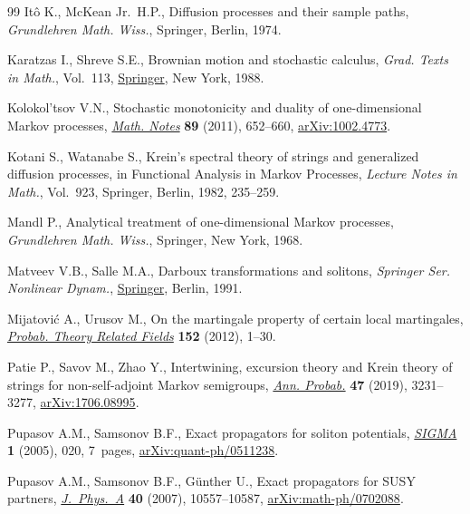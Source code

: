 \documentclass[10pt,a4paper]{amsart}
\numberwithin{equation}{section}
\theoremstyle{definition}
\def\i{{\textnormal i}}
\begin{document}
\begin{thebibliography}{99}
It\^o K., McKean Jr.~H.P., Diffusion processes and their sample paths,
 \textit{Grundlehren Math. Wiss.}, Springer, Berlin, 1974.

Karatzas I., Shreve S.E., Brownian motion and stochastic calculus,
 \textit{Grad. Texts in Math.}, Vol.~113,
 \href{https://doi.org/10.1007/978-1-4684-0302-2}{Springer}, New York, 1988.

Kolokol'tsov V.N., Stochastic monotonicity and duality of one-dimensional
 {M}arkov processes,
 \href{https://doi.org/10.1134/S0001434611050063}{\textit{Math. Notes}}
 \textbf{89} (2011), 652--660,
 \href{http://arxiv.org/abs/1002.4773}{arXiv:1002.4773}.

Kotani S., Watanabe S., Kre\u{\i}n's spectral theory of strings and generalized
 diffusion processes, in Functional {A}nalysis in {M}arkov {P}rocesses,
 \textit{Lecture Notes in Math.}, Vol.~923, Springer, Berlin, 1982, 235--259.

Mandl P., Analytical treatment of one-dimensional {M}arkov processes,
 \textit{Grundlehren Math. Wiss.}, Springer, New York, 1968.

Matveev V.B., Salle M.A., Darboux transformations and solitons, \textit{Springer Ser. Nonlinear Dynam.}, \href{https://doi.org/10.1007/978-3-662-00922-2}{Springer},
 Berlin, 1991.

Mijatovi\'c A., Urusov M., On the martingale property of certain local
 martingales, \href{https://doi.org/10.1007/s00440-010-0314-7}{\textit{Probab.
 Theory Related Fields}} \textbf{152} (2012), 1--30.

Patie P., Savov M., Zhao Y., Intertwining, excursion theory and {K}rein theory
 of strings for non-self-adjoint {M}arkov semigroups,
 \href{https://doi.org/10.1214/19-AOP1338}{\textit{Ann. Probab.}} \textbf{47}
 (2019), 3231--3277, \href{http://arxiv.org/abs/1706.08995}{arXiv:1706.08995}.

Pupasov A.M., Samsonov B.F., Exact propagators for soliton potentials,
 \href{https://doi.org/10.3842/SIGMA.2005.020}{\textit{SIGMA}} \textbf{1}
 (2005), 020, 7~pages,
 \href{http://arxiv.org/abs/quant-ph/0511238}{arXiv:quant-ph/0511238}.

Pupasov A.M., Samsonov B.F., G\"unther U., Exact propagators for {SUSY}
 partners,
 \href{https://doi.org/10.1088/1751-8113/40/34/013}{\textit{J.~Phys.~A}}
 \textbf{40} (2007), 10557--10587,
 \href{http://arxiv.org/abs/math-ph/0702088}{arXiv:math-ph/0702088}.


\end{thebibliography}
\end{document}

